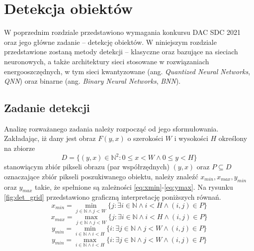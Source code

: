 \chapter{Detekcja obiektów}
\label{ch:detekcja}
W poprzednim rozdziale przedstawiono wymagania konkursu DAC SDC 2021 oraz jego główne zadanie -- detekcję obiektów. 
W niniejszym rozdziale przedstawione zostaną metody detekcji -- klasyczne oraz bazujące na sieciach neuronowych, 
a także architektury sieci stosowane w rozwiązaniach energooszczędnych, w tym sieci kwantyzowane (ang. \emph{Quantized Neural Networks}, \emph{QNN}) oraz binarne (ang. \emph{Binary Neural Networks}, \emph{BNN}).

\section{Zadanie detekcji}

Analizę rozważanego zadania należy rozpocząć od jego sformułowania. 
Zakładając, iż dany jest obraz $F(y,x)$ 
o szerokości $W$ i wysokości $H$
określony na zbiorze 
\begin{equation}
D = \{(y,x) \in \mathbb{N} ^2 : 0 \leq x < W \land 0 \leq y < H\}
\end{equation}
stanowiącym zbiór pikseli obrazu (par współrzędnych) $(y,x)$ 
oraz $P \subseteq D$ oznaczające zbiór pikseli poszukiwanego obiektu, należy znaleźć $x_{min},x_{max},y_{min}$ oraz $y_{max}$ takie, że spełnione są zależności \eqref{eq:xmin}-\eqref{eq:ymax}.
Na rysunku \ref{fig:det_grid} przedstawiono graficzną interpretację poniższych równań.
\begin{equation}
x_{min} = \min_{j \in \mathbb{N} \land j < W }\{j : \exists i \in \mathbb{N} \land i < H \land (i,j) \in P \}
\label{eq:xmin}
\end{equation}
\begin{equation}
x_{max} = \max_{j \in \mathbb{N} \land j < W }\{j : \exists i \in \mathbb{N} \land i < H  \land (i,j) \in P \}
\label{eq:xmax}
\end{equation}
\begin{equation}
y_{min} = \min_{i \in \mathbb{N} \land i < H }\{i : \exists j \in \mathbb{N} \land j < W \land (i,j) \in P \}
\label{eq:ymin}
\end{equation}
\begin{equation}
y_{min} = \max_{i \in \mathbb{N} \land i < H }\{i: \exists j \in \mathbb{N} \land j < W \land (i,j) \in P \}
\label{eq:ymax}
\end{equation}

